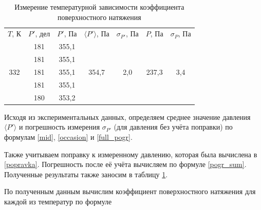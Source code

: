 \documentclass[a4paper,12pt]{article} %
\begin{document}
\begin{table}[H]
\begin{tabular}{ccccccc}
		&
		&
		&
		&
		&
		&
		\\ \hline
		\multicolumn{1}{|c|}{$ T $, К} &
		\multicolumn{1}{c|}{$ P' $, дел} &
		\multicolumn{1}{c|}{$ P' $, Па} &
		\multicolumn{1}{c|}{$ \langle P' \rangle $, Па} &
		\multicolumn{1}{c|}{$ \sigma_{P'} $, Па} &
		\multicolumn{1}{c|}{$ P $, Па} &
		\multicolumn{1}{c|}{$ \sigma_P $, Па} \\ \hline
		\multicolumn{1}{|c|}{\multirow{5}{*}{332}} &
		\multicolumn{1}{c|}{181} &
		\multicolumn{1}{c|}{355,1} &
		\multicolumn{1}{c|}{\multirow{5}{*}{354,7}} &
		\multicolumn{1}{c|}{\multirow{5}{*}{2,0}} &
		\multicolumn{1}{c|}{\multirow{5}{*}{237,3}} &
		\multicolumn{1}{c|}{\multirow{5}{*}{3,4}} \\ \cline{2-3}
		\multicolumn{1}{|c|}{} &
		\multicolumn{1}{c|}{181} &
		\multicolumn{1}{c|}{355,1} &
		\multicolumn{1}{c|}{} &
		\multicolumn{1}{c|}{} &
		\multicolumn{1}{c|}{} &
		\multicolumn{1}{c|}{} \\ \cline{2-3}
		\multicolumn{1}{|c|}{} &
		\multicolumn{1}{c|}{181} &
		\multicolumn{1}{c|}{355,1} &
		\multicolumn{1}{c|}{} &
		\multicolumn{1}{c|}{} &
		\multicolumn{1}{c|}{} &
		\multicolumn{1}{c|}{} \\ \cline{2-3}
		\multicolumn{1}{|c|}{} &
		\multicolumn{1}{c|}{181} &
		\multicolumn{1}{c|}{355,1} &
		\multicolumn{1}{c|}{} &
		\multicolumn{1}{c|}{} &
		\multicolumn{1}{c|}{} &
		\multicolumn{1}{c|}{} \\ \cline{2-3}
		\multicolumn{1}{|c|}{} &
		\multicolumn{1}{c|}{180} &
		\multicolumn{1}{c|}{353,2} &
		\multicolumn{1}{c|}{} &
		\multicolumn{1}{c|}{} &
		\multicolumn{1}{c|}{} &
		\multicolumn{1}{c|}{} \\ \hline
	\end{tabular}
	\caption{Измерение температурной зависимости коэффициента поверхностного натяжения}
	\label{tab:pov}
\end{table}
\newpage
Исходя из экспериментальных данных, определяем среднее значение давления $ \langle P' \rangle $ и погрешность измерения $ \sigma_{P'} $ (для давления без учёта поправки) по формулам \eqref{mid}, \eqref{occasion} и \eqref{full_pogr}.

Также учитываем поправку к измеренному давлению, которая была вычислена в \ref{popravka}. Погрешность после её учёта вычисляем по формуле \eqref{pogr_sum}. Полученные результаты также заносим в таблицу \ref{tab:pov}.

По полученным данным вычислим коэффициент поверхностного натяжения для каждой из температур по формуле
\end{document}
